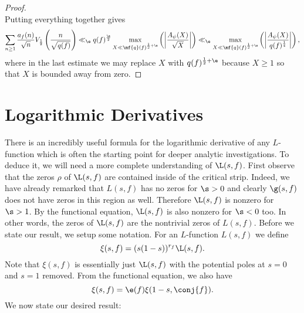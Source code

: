 \begin{proof}
\[      \]
      Putting everything together gives
      \[
        \sum_{n \ge 1}\frac{a_{f}(n)}{\sqrt{n}}V_{\frac{1}{2}}\left(\frac{n}{\sqrt{q(f)}}\right) \ll_{\e} q(f)^{\frac{\e}{2}}\max_{X \ll \mf{q}(f)^{\frac{1}{2}+\e}}\left(\left|\frac{A_{\psi}(X)}{\sqrt{X}}\right|\right) \ll_{\e} \max_{X \ll \mf{q}(f)^{\frac{1}{2}+\e}}\left(\left|\frac{A_{\psi}(X)}{q(f)^{\frac{1}{4}}}\right|\right),
      \]
      where in the last estimate we may replace $X$ with $q(f)^{\frac{1}{2}+\e}$ because $X \ge 1$ so that $X$ is bounded away from zero.
    \end{proof}
  \section{Logarithmic Derivatives}
    There is an incredibly useful formula for the logarithmic derivative of any $L$-function which is often the starting point for deeper analytic investigations. To deduce it, we will need a more complete understanding of $\L(s,f)$. First observe that the zeros $\rho$ of $\L(s,f)$ are contained inside of the critical strip. Indeed, we have already remarked that $L(s,f)$ has no zeros for $\s > 0$ and clearly $\g(s,f)$ does not have zeros in this region as well. Therefore $\L(s,f)$ is nonzero for $\s > 1$. By the functional equation, $\L(s,f)$ is also nonzero for $\s < 0$ too. In other words, the zeros of $\L(s,f)$ are the nontrivial zeros of $L(s,f)$. Before we state our result, we setup some notation. For an $L$-function $L(s,f)$ we define
    \[
      \xi(s,f) = (s(1-s))^{r_{f}}\L(s,f).
    \]
    Note that $\xi(s,f)$ is essentially just $\L(s,f)$ with the potential poles at $s = 0$ and $s = 1$ removed. From the functional equation, we also have
    \[
      \xi(s,f) = \e(f)\xi(1-s,\conj{f}).
    \]
    We now state our desired result:

